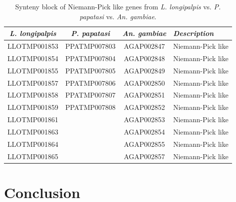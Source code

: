 \begin{table}[H]
  \centering
  \begin{tabular}{c c c l} \hline
    \emph{L. longipalpis} & \emph{P. papatasi} & \emph{An. gambiae} & \emph{Description} \\ \hline
    LLOTMP001853 & PPATMP007803 & AGAP002847 & Niemann-Pick like \\
    LLOTMP001854 & PPATMP007804 & AGAP002848 & Niemann-Pick like \\
    LLOTMP001855 & PPATMP007805 & AGAP002849 & Niemann-Pick like \\
    LLOTMP001857 & PPATMP007806 & AGAP002850 & Niemann-Pick like \\
    LLOTMP001858 & PPATMP007807 & AGAP002851 & Niemann-Pick like \\
    LLOTMP001859 & PPATMP007808 & AGAP002852 & Niemann-Pick like \\
    LLOTMP001861 & & AGAP002853 & Niemann-Pick like \\
    LLOTMP001863 & & AGAP002854 & Niemann-Pick like \\
    LLOTMP001864 & & AGAP002855 & Niemann-Pick like \\
    LLOTMP001865 & & AGAP002857 & Niemann-Pick like
    \end{tabular}
    \caption{Synteny block of Niemann-Pick like genes from \emph{L. longipalpis} vs. \emph{P. papatasi} vs. \emph{An. gambiae}.}
  \label{tab:synteny-three-way-npc2}
\end{table}


\section{Conclusion}





